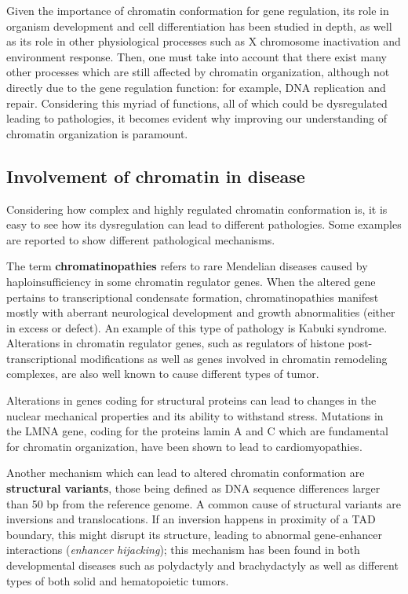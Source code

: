 Given the importance of chromatin conformation for gene regulation, its role in organism development and cell differentiation has been studied in depth\cite{chromatindevelopment2019}, as well as its role in other physiological processes such as X chromosome inactivation\cite{xsilencing2017} and environment response\cite{epigeneticsenvironment2019}. Then, one must take into account that there exist many other processes which are still affected by chromatin organization, although not directly due to the gene regulation function: for example, DNA replication\cite{chromatinreplication2017} and repair\cite{chromatinrepair2017}. Considering this myriad of functions, all of which could be dysregulated leading to pathologies, it becomes evident why improving our understanding of chromatin organization is paramount.

\subsection{Involvement of chromatin in disease}
Considering how complex and highly regulated chromatin conformation is, it is easy to see how its dysregulation can lead to different pathologies. Some examples are reported to show different pathological mechanisms.

The term \textbf{chromatinopathies} refers to rare Mendelian diseases caused by haploinsufficiency in some chromatin regulator genes. When the altered gene pertains to transcriptional condensate formation, chromatinopathies manifest mostly with aberrant neurological development and growth abnormalities (either in excess or defect). An example of this type of pathology is Kabuki syndrome\cite{condensates2023}. Alterations in chromatin regulator genes, such as regulators of histone post-transcriptional modifications as well as genes involved in chromatin remodeling complexes, are also well known to cause different types of tumor\cite{histonemodifications2020, remodelingcancer2022}.

Alterations in genes coding for structural proteins can lead to changes in the nuclear mechanical properties and its ability to withstand stress. Mutations in the LMNA gene, coding for the proteins lamin A and C which are fundamental for chromatin organization, have been shown to lead to cardiomyopathies\cite{chromatincardiomyopathy2021}. 

Another mechanism which can lead to altered chromatin conformation are \textbf{structural variants}, those being defined as DNA sequence differences larger than 50 bp from the reference genome\cite{sequencevariations2023}. A common cause of structural variants are inversions and translocations. If an inversion happens in proximity of a TAD boundary, this might disrupt its structure, leading to abnormal gene-enhancer interactions (\emph{enhancer hijacking}); this mechanism has been found in both developmental diseases such as polydactyly and brachydactyly\cite{epigeneticlimb2015} as well as different types of both solid and hematopoietic tumors\cite{chromatincancer2022, sequencevariations2023}.

